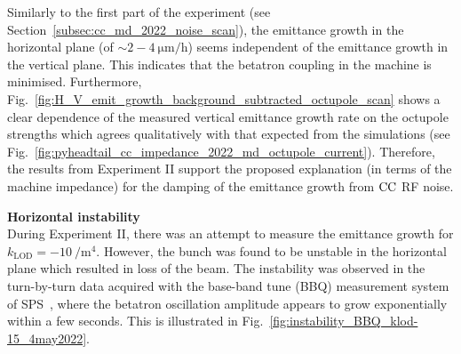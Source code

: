 Similarly to the first part of the experiment (see Section~\ref{subsec:cc_md_2022_noise_scan}), the emittance growth in the horizontal plane (of $\sim 2-4 \ \mathrm{\mu m/h}$) seems independent of the emittance growth in the vertical plane. This indicates that the betatron coupling in the machine is minimised. Furthermore, Fig.~\ref{fig:H_V_emit_growth_background_subtracted_octupole_scan} shows a clear dependence of the measured vertical emittance growth rate on the octupole strengths which agrees qualitatively with that expected from the simulations (see Fig.~\ref{fig:pyheadtail_cc_impedance_2022_md_octupole_current}). Therefore, the results from Experiment II support the proposed explanation (in terms of the machine impedance) for the damping of the emittance growth from ${\mathrm{CC}}$ RF noise.

\textbf{Horizontal instability}\\
During Experiment II, there was an attempt to measure the emittance growth for $k_\mathrm{LOD}=-10 \ \mathrm{/m^4}$. However, the bunch was found to be unstable in the horizontal plane which resulted in loss of the beam. The instability was observed in the turn-by-turn data acquired with the base-band tune (BBQ) measurement system of SPS~\cite{Boccardi:1055568}, where the betatron oscillation amplitude appears to grow exponentially within a few seconds. This is illustrated in Fig.~\ref{fig:instability_BBQ_klod-15_4may2022}.






